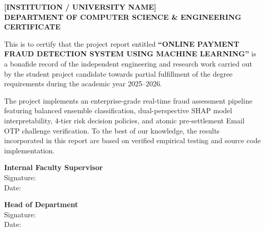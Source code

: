\newpage
\thispagestyle{plain}
\begin{center}
    {\Large \bfseries \color{primaryblue} [INSTITUTION / UNIVERSITY NAME]}\\[0.2cm]
    {\large \bfseries DEPARTMENT OF COMPUTER SCIENCE \& ENGINEERING}\\[0.8cm]
    {\LARGE \bfseries \color{darkslate} CERTIFICATE}\\[0.8cm]
\end{center}

This is to certify that the project report entitled \textbf{``ONLINE PAYMENT FRAUD DETECTION SYSTEM USING MACHINE LEARNING''} is a bonafide record of the independent engineering and research work carried out by the student project candidate towards partial fulfillment of the degree requirements during the academic year 2025--2026.

The project implements an enterprise-grade real-time fraud assessment pipeline featuring balanced ensemble classification, dual-perspective SHAP model interpretability, 4-tier risk decision policies, and atomic pre-settlement Email OTP challenge verification. To the best of our knowledge, the results incorporated in this report are based on verified empirical testing and source code implementation.

\vspace{2.5cm}

\noindent
\begin{minipage}{0.45\textwidth}
    \begin{flushleft}
        \textbf{Internal Faculty Supervisor}\\[0.2cm]
        Signature: \underline{\hspace{4.0cm}}\\[0.2cm]
        Date: \underline{\hspace{4.0cm}}
    \end{flushleft}
\end{minipage}
\hfill
\begin{minipage}{0.45\textwidth}
    \begin{flushright}
        \textbf{Head of Department}\\[0.2cm]
        Signature: \underline{\hspace{4.0cm}}\\[0.2cm]
        Date: \underline{\hspace{4.0cm}}
    \end{flushright}
\end{minipage}

